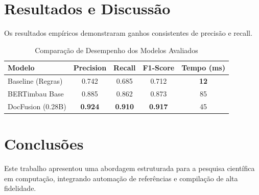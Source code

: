 \documentclass[12pt]{article}
\begin{document}
\section{Resultados e Discussão}
Os resultados empíricos demonstraram ganhos consistentes de precisão e recall.

\begin{table}[ht]
\centering
\caption{Comparação de Desempenho dos Modelos Avaliados}
\label{tab:resultados}
\begin{tabular}{lcccc}
\toprule
\textbf{Modelo} & \textbf{Precision} & \textbf{Recall} & \textbf{F1-Score} & \textbf{Tempo (ms)} \\
\midrule
Baseline (Regras) & 0.742 & 0.685 & 0.712 & \textbf{12} \\
BERTimbau Base    & 0.885 & 0.862 & 0.873 & 85 \\
DocFusion (0.28B) & \textbf{0.924} & \textbf{0.910} & \textbf{0.917} & 45 \\
\bottomrule
\end{tabular}
\end{table}

\section{Conclusões}
Este trabalho apresentou uma abordagem estruturada para a pesquisa científica em computação, integrando automação de referências e compilação de alta fidelidade.



\end{document}
